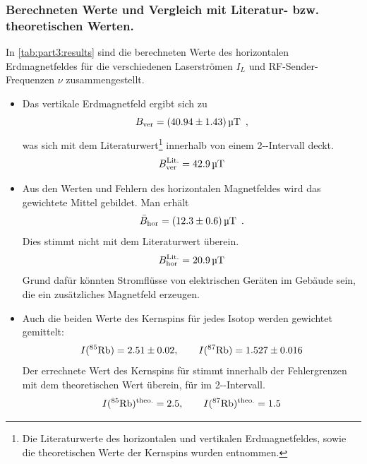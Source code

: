 \subsubsection*{Berechneten Werte und Vergleich mit Literatur- bzw. theoretischen Werten.}
In \autoref{tab:part3:results} sind die berechneten Werte des horizontalen Erdmagnetfeldes für die verschiedenen Laserströmen $I_L$ und 
RF-Sender-Frequenzen $\nu$ zusammengestellt. 
\begin{itemize}
    \item Das vertikale Erdmagnetfeld ergibt sich zu
    \begin{equation}
        B_\text{ver} = (40.94 \pm 1.43)\,\text{\textmu T}\ \, ,
    \end{equation}
    was sich mit dem Literaturwert\footnote{Die Literaturwerte des horizontalen und vertikalen Erdmagnetfeldes, sowie die theoretischen Werte der
    Kernspins wurden \cite{manual} entnommen.} innerhalb von einem 2-\textsigma-Intervall deckt.
    \begin{equation}
    \label{eq:litvalBver}
        B_\text{ver}^{\text{Lit.}} = 42.9\,\text{\textmu T}
    \end{equation}
    \item Aus den Werten und Fehlern des horizontalen Magnetfeldes wird das gewichtete Mittel gebildet. Man erhält
    \begin{equation}
        \bar{B}_\text{hor} = (12.3 \pm 0.6)\,\text{\textmu T}\ \, .
    \end{equation}
    Dies stimmt nicht mit dem Literaturwert überein.
    \begin{equation}
        B_\text{hor}^{\text{Lit.}} = 20.9\,\text{\textmu T}
    \end{equation}
    Grund dafür könnten Stromflüsse von elektrischen Geräten im Gebäude sein, die ein zusätzliches Magnetfeld erzeugen.
    \item Auch die beiden Werte des Kernspins für jedes Isotop werden gewichtet gemittelt:
    \begin{equation}
        I(\text{$^{85}$Rb}) = 2.51 \pm 0.02, \qquad I(\text{$^{87}$Rb}) = 1.527 \pm 0.016
    \end{equation}
    Der errechnete Wert des Kernspins für  stimmt innerhalb der Fehlergrenzen mit dem theoretischen Wert überein, 
    für  im 2-\textsigma-Intervall.
    \begin{equation}
        I(\text{$^{85}$Rb})^\text{theo.} = 2.5, \qquad I(\text{$^{87}$Rb})^\text{theo.} = 1.5
    \end{equation}
\end{itemize}